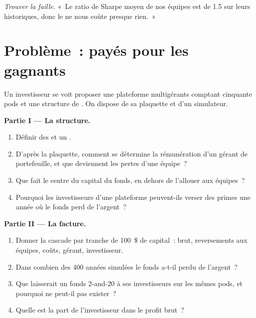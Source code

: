 \begin{exercise}[$\star\star\star$]\label{exo:fm:the-multi-manager-platform:8}
\emph{Trouver la faille.} «~Le ratio de Sharpe moyen de nos équipes est de 1.5 sur leurs historiques, donc le  ne nous coûte presque rien.~»
\end{exercise}

\section{Problème~: payés pour les gagnants}

\begin{problem}\label{pb:fm:the-multi-manager-platform:1}
Un investisseur se voit proposer une plateforme multigérants comptant cinquante pods et une structure de . On dispose de sa plaquette et d'un simulateur.

\medskip\noindent\textbf{Partie I --- La structure.}
\begin{enumerate}
\item Définir des  et un .
\item D'après la plaquette, comment se détermine la rémunération d'un gérant de portefeuille, et que deviennent les pertes d'une équipe~?
\item Que fait le centre du capital du fonds, en dehors de l'allouer aux équipes~?
\item Pourquoi les investisseurs d'une plateforme peuvent-ils verser des primes une année où le fonds perd de l'argent~?
\end{enumerate}

\medskip\noindent\textbf{Partie II --- La facture.}
\begin{enumerate}[resume]
\item Donner la cascade par tranche de 100~\$ de capital~: brut, reversements aux équipes, coûts, gérant, investisseur.
\item Dans combien des 400 années simulées le fonds a-t-il perdu de l'argent~?
\item Que laisserait un fonds 2-and-20 à ses investisseurs sur les mêmes pods, et pourquoi ne peut-il pas exister~?
\item Quelle est la part de l'investisseur dans le profit brut~?
\end{enumerate}


\end{problem}
